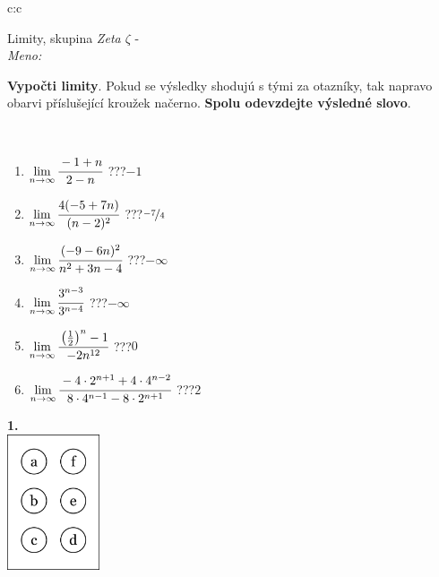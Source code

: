 \documentclass[10pt]{report}
\begin{document}
\begin{tabular}{c:c}
\begin{minipage}[c][104.5mm][t]{0.5\linewidth}
\begin{center}
\vspace{7mm}
{\huge Limity, skupina \textit{Zeta $\zeta$} -}\\[5mm]
\textit{Meno:}\phantom{xxxxxxxxxxxxxxxxxxxxxxxxxxxxxxxxxxxxxxxxxxxxxxxxxxxxxxxxxxxxxxxxx}\\[5mm]
\begin{minipage}{0.95\linewidth}
\begin{center}
\textbf{Vypočti limity}. Pokud se výsledky shodujú s tými za otazníky, tak napravo\\obarvi příslušející kroužek načerno. \textbf{Spolu odevzdejte výsledné slovo}.
\end{center}
\end{minipage}
\\[1mm]
\begin{minipage}{0.79\linewidth}
\begin{center}
\begin{varwidth}{\linewidth}
\begin{enumerate}
\normalsize
\item $\lim\limits_{n\to\infty}\cfrac{-1+n}{2-n}$\quad \dotfill\; ???\;\dotfill \quad $-1$
\item $\lim\limits_{n\to\infty}\cfrac{4(-5+7n)}{(n-2)^2}$\quad \dotfill\; ???\;\dotfill \quad $\nicefrac{-7}{4}$
\item $\lim\limits_{n\to\infty}\cfrac{(-9-6n)^2}{n^2+3n-4}$\quad \dotfill\; ???\;\dotfill \quad $-\infty$
\item $\lim\limits_{n\to\infty}\cfrac{3^{n-3}}{3^{n-4}}$\quad \dotfill\; ???\;\dotfill \quad $-\infty$
\item $\lim\limits_{n\to\infty}\cfrac{\left(\frac{1}{2}\right)^n -1}{-2n^{12}}$\quad \dotfill\; ???\;\dotfill \quad $0$
\item $\lim\limits_{n\to\infty}\cfrac{-4\cdot 2^{n+1}+4\cdot 4^{n-2}}{8\cdot 4^{n-1}-8\cdot 2^{n+1}}$\quad \dotfill\; ???\;\dotfill \quad $2$
\end{enumerate}
\end{varwidth}
\end{center}
\end{minipage}
\begin{minipage}{0.20\linewidth}
\begin{center}
{\Huge\bfseries 1.} \\[2mm]
\includegraphics[height=40mm]{../images/braille.png}

\end{center}
\end{minipage}
\end{center}
\end{minipage}
\end{tabular}
\end{document}
